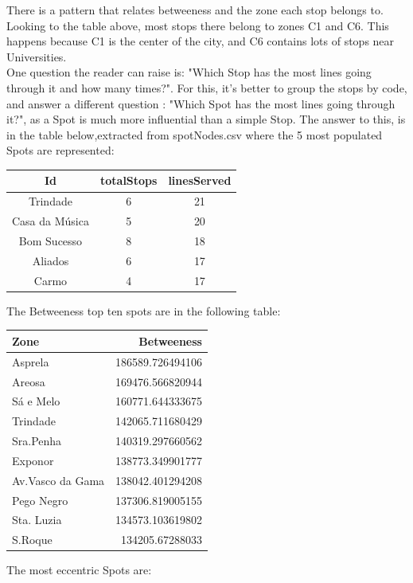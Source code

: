 \documentclass[12pt]{article}
\begin{document}
\begin{multicols}{2}
There is a pattern that relates betweeness and the zone each stop belongs to. Looking to the table above,  most stops there belong to zones C1 and C6. This happens because C1 is the center of the city, and C6 contains lots of stops near Universities.\\
One question the reader can raise is: "Which Stop has the most lines going through it and how many times?". For this, it's better to group the stops by code, and answer a different question : "Which Spot has the most lines going through it?", as a Spot is much more influential than a simple Stop. The answer to this, is in the table below,extracted from spotNodes.csv where the 5 most populated Spots are represented:
\begin{center}
\begin{tabular}[h]{ |c|c|c| }
\hline
    Id  & totalStops & linesServed\\
    \hline
    Trindade & 6  & 21 \\
    Casa da Música & 5 & 20 \\
    Bom Sucesso  & 8 & 18 \\
    Aliados & 6 & 17 \\
    Carmo & 4 & 17 \\
\hline
\end{tabular}
\end{center}
The Betweeness top ten spots are in the following table:
\begin{center}
\begin{tabular}[h]{|l|r|}
\hline
Zone & Betweeness\\
\hline
Asprela & 186589.726494106\\
Areosa & 169476.566820944\\
Sá e Melo  & 160771.644333675\\
Trindade & 142065.711680429\\
Sra.Penha & 140319.297660562\\
Exponor & 138773.349901777\\
Av.Vasco da Gama & 138042.401294208\\
Pego Negro & 137306.819005155\\
Sta. Luzia & 134573.103619802\\
S.Roque & 134205.67288033\\
\hline
\end{tabular}
\end{center}
The most eccentric Spots are:\\

\end{multicols}
\end{document}
